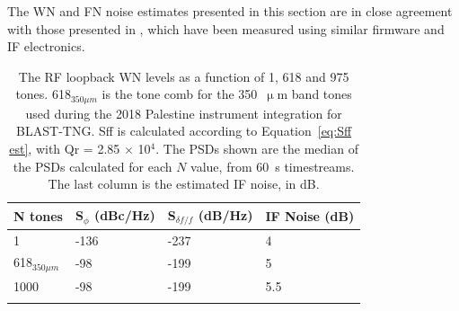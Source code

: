 The WN and FN noise estimates presented in this section are in close agreement with those presented in \citet{gordon2016}, which have been measured using similar firmware and IF electronics.

\begin{table}[!htbp]
\centering
\begin{tabular}{@{}llll@{}}
\dtoprule{}
N tones & S$_{\phi}$ (dBc/Hz) & S$_{\delta f / f}$ (dB/Hz) & IF Noise (dB) \\ \midrule
1 & -136 & -237 & 4 \\
618$_{350\mu m}$ & -98 & -199 & 5 \\
1000 & -98 & -199 & 5.5 \\ \dbottomrule{}
\\
\end{tabular}
\caption[~RF loopback noise levels for different numbers of probe tones.]{The RF loopback WN levels as a function of 1, 618 and 975 tones. 618$_{350\mu m}$ is the tone comb for the 350~$\upmu$m band tones used during the 2018 Palestine instrument integration for BLAST-TNG\@. \gls{Sff} is calculated according to Equation~\ref{eq:Sff est}, with \gls{Qr} = 2.85 $\times$ 10$^{4}$. The PSDs shown are the median of the PSDs calculated for each $N$ value, from 60~s timestreams. The last column is the estimated IF noise, in dB.}
\label{tab:rf loopback}
\end{table}


